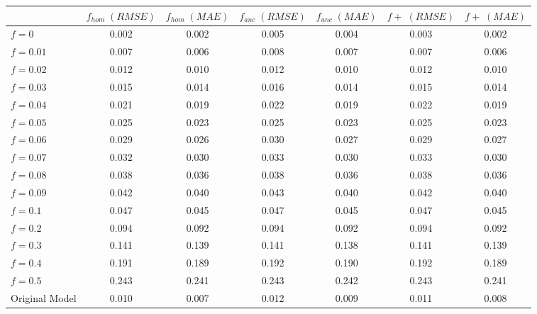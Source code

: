 \begin{tabular}{lcccccc}
\toprule
 & $f_{hom}\;(RMSE)$ & $f_{hom}\;(MAE)$ & $f_{anc}\;(RMSE)$ & $f_{anc}\;(MAE)$ & $f+\;(RMSE)$ & $f+\;(MAE)$ \\
\midrule
$f = 0$ & 0.002 & 0.002 & 0.005 & 0.004 & 0.003 & 0.002 \\
$f = 0.01$ & 0.007 & 0.006 & 0.008 & 0.007 & 0.007 & 0.006 \\
$f = 0.02$ & 0.012 & 0.010 & 0.012 & 0.010 & 0.012 & 0.010 \\
$f = 0.03$ & 0.015 & 0.014 & 0.016 & 0.014 & 0.015 & 0.014 \\
$f = 0.04$ & 0.021 & 0.019 & 0.022 & 0.019 & 0.022 & 0.019 \\
$f = 0.05$ & 0.025 & 0.023 & 0.025 & 0.023 & 0.025 & 0.023 \\
$f = 0.06$ & 0.029 & 0.026 & 0.030 & 0.027 & 0.029 & 0.027 \\
$f = 0.07$ & 0.032 & 0.030 & 0.033 & 0.030 & 0.033 & 0.030 \\
$f = 0.08$ & 0.038 & 0.036 & 0.038 & 0.036 & 0.038 & 0.036 \\
$f = 0.09$ & 0.042 & 0.040 & 0.043 & 0.040 & 0.042 & 0.040 \\
$f = 0.1$ & 0.047 & 0.045 & 0.047 & 0.045 & 0.047 & 0.045 \\
$f = 0.2$ & 0.094 & 0.092 & 0.094 & 0.092 & 0.094 & 0.092 \\
$f = 0.3$ & 0.141 & 0.139 & 0.141 & 0.138 & 0.141 & 0.139 \\
$f = 0.4$ & 0.191 & 0.189 & 0.192 & 0.190 & 0.192 & 0.189 \\
$f = 0.5$ & 0.243 & 0.241 & 0.243 & 0.242 & 0.243 & 0.241 \\
Original Model & 0.010 & 0.007 & 0.012 & 0.009 & 0.011 & 0.008 \\
\bottomrule
\end{tabular}
